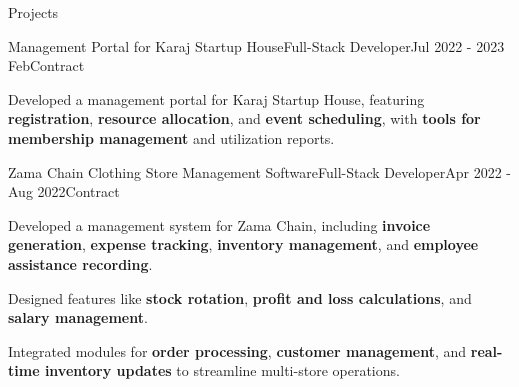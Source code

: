 \documentclass[]{kyvernitis-resume}
\begin{document}
\begin{section}{Projects}


\begin{subsection}{Management Portal for Karaj Startup House}{Full-Stack Developer}{Jul 2022 - 2023 Feb}{Contract}{}
		\item Developed a management portal for Karaj Startup House, featuring \textbf{registration}, \textbf{resource allocation}, and \textbf{event scheduling}, with \textbf{tools for membership management} and utilization reports.
\end{subsection}


    \begin{subsection}{Zama Chain Clothing Store Management Software}{Full-Stack Developer}{Apr 2022 - Aug 2022}{Contract}{}
		\item Developed a management system for Zama Chain, including \textbf{invoice generation}, \textbf{expense tracking}, \textbf{inventory management}, and \textbf{employee assistance recording}.
		\item Designed features like \textbf{stock rotation}, \textbf{profit and loss calculations}, and \textbf{salary management}.
		\item Integrated modules for \textbf{order processing}, \textbf{customer management}, and \textbf{real-time inventory updates} to streamline multi-store operations.
    \end{subsection}



\end{section}
\end{document}
